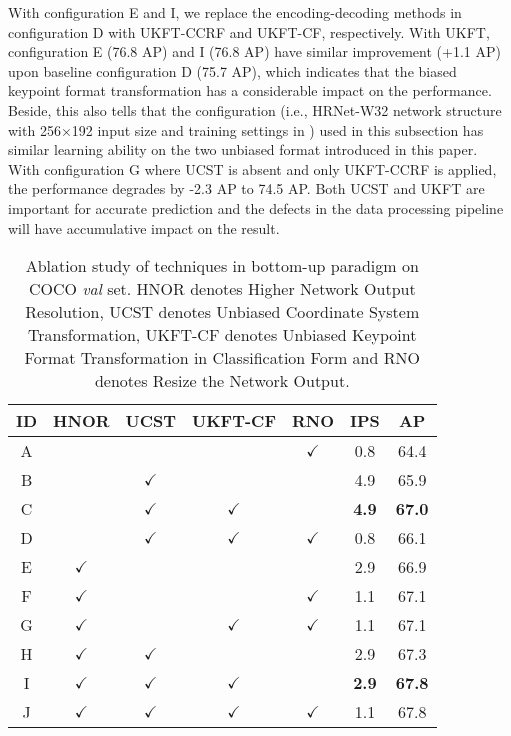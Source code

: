 \documentclass[10pt,journal,compsoc]{IEEEtran}
\begin{document}
With configuration E and I, we replace the encoding-decoding methods in configuration D with UKFT-CCRF and UKFT-CF, respectively. With UKFT, configuration E (76.8 AP) and I (76.8 AP) have similar improvement (+1.1 AP) upon baseline configuration D (75.7 AP), which indicates that the biased keypoint format transformation has a considerable impact on the performance. Beside, this also tells that the configuration (i.e., HRNet-W32 network structure with 256$\times$192 input size and training settings in \cite{HRNet}) used in this subsection has similar learning ability on the two unbiased format introduced in this paper. With configuration G where UCST is absent and only UKFT-CCRF is applied, the performance degrades by -2.3 AP to 74.5 AP. Both UCST and UKFT are important for accurate prediction and the defects in the data processing pipeline will have accumulative impact on the result.





\begin{table}[h]
\footnotesize
\caption{Ablation study of techniques in bottom-up paradigm on COCO \textit{val} set. HNOR denotes Higher Network Output Resolution, UCST denotes Unbiased Coordinate System Transformation, UKFT-CF denotes Unbiased Keypoint Format Transformation in Classification Form and RNO denotes Resize the Network Output.}
\begin{center}
\begin{tabular}{c|c|c|c|c|c|c}

\hline
ID      &HNOR           &UCST           &UKFT-CF        &RNO            &IPS            &AP    \\
\hline
A       &               &               &               &$\checkmark$   &0.8            &64.4 \\
B       &               &$\checkmark$   &               &               &4.9            &65.9 \\
C       &               &$\checkmark$   &$\checkmark$   &               &\textbf{4.9}   &\textbf{67.0} \\
D       &               &$\checkmark$   &$\checkmark$   &$\checkmark$   &0.8            &66.1 \\
\hline
E       &$\checkmark$   &               &               &               &2.9            &66.9 \\
F       &$\checkmark$   &               &               &$\checkmark$   &1.1            &67.1 \\
G       &$\checkmark$   &               &$\checkmark$   &$\checkmark$   &1.1            &67.1 \\
H       &$\checkmark$   &$\checkmark$   &               &               &2.9            &67.3 \\
I       &$\checkmark$   &$\checkmark$   &$\checkmark$   &               &\textbf{2.9}   &\textbf{67.8} \\
J       &$\checkmark$   &$\checkmark$   &$\checkmark$   &$\checkmark$   &1.1            &67.8 \\
\hline
\end{tabular}
\end{center}
\label{tab:ablation_bottom_up}
\end{table}
\end{document}
